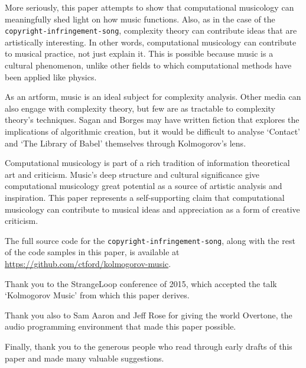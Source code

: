 \documentclass[numbers]{sigplanconf}
\begin{document}
More seriously, this paper attempts to show that computational musicology can meaningfully shed light on how music functions.
Also, as in
the case of the \verb|copyright-infringement-song|, complexity theory can contribute ideas that are artistically interesting.
In other words, computational musicology can contribute to musical practice, not just explain it. This is possible because music
is a cultural phenomenon, unlike other fields to which computational methods have been applied like physics.

As an artform, music is an ideal subject for complexity analysis. Other media can also engage with complexity theory, but
few are as tractable to complexity theory's techniques. Sagan and Borges may have written fiction that explores the implications
of algorithmic creation, but it would be difficult to analyse `Contact' and `The Library of Babel' themselves through
Kolmogorov's lens.

Computational musicology is part of a rich tradition of information theoretical art and criticism. Music's deep structure and
cultural significance give computational musicology great potential as a source of artistic analysis and inspiration.
This paper represents a self-supporting claim that computational musicology can contribute to musical ideas and appreciation as
a form of creative criticism.

The full source code for the \verb|copyright-infringement-song|, along with the rest of the code samples in this paper, is
available at \url{https://github.com/ctford/kolmogorov-music}.

\acks

Thank you to the StrangeLoop conference of 2015, which accepted the talk `Kolmogorov Music' from which this paper derives.

Thank you also to Sam Aaron and Jeff Rose for giving the world Overtone\cite{Overtone}, the audio programming environment
that made this paper possible.

Finally, thank you to the generous people who read through early drafts of this paper and made many valuable suggestions.



\end{document}
